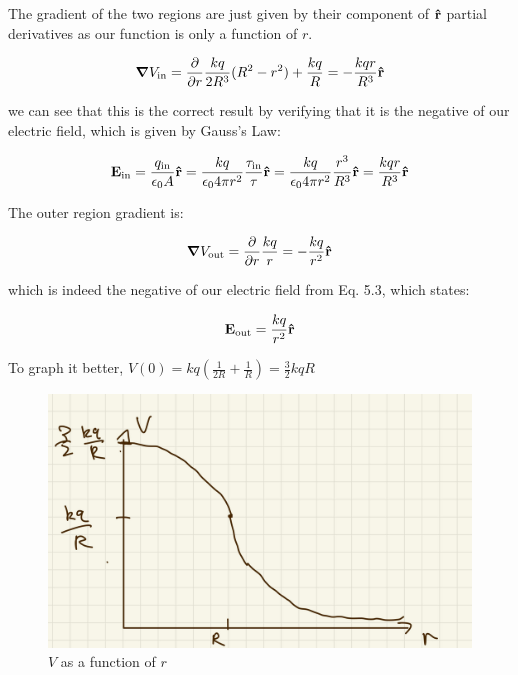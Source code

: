 \documentclass{article}
\numberwithin{equation}{section}
\numberwithin{figure}{section}
\newcommand{\vbh}[1]{\vb{\hat{#1}}}
\begin{document}
The gradient of the two regions are just given by their component of $\vbh r$ partial derivatives as our function is only a function of $r$.

\begin{equation}
    \grad V_\text{in} = \frac{\partial}{\partial r} \frac{kq}{2R^3} (R^2 - r^2) + \frac{kq}{R}= -\frac{kqr}{R^3} \vbh r
\end{equation}

we can see that this is the correct result by verifying that it is the negative of our electric field, which is given by Gauss's Law:

\begin{equation}
    \vb E_\text{in} = \frac{q_{\text{in}}}{\epsilon_0 A}\vbh r = \frac{kq}{\epsilon_0 4 \pi r^2} \frac{\tau_\text{in}}{\tau}\vbh r =  \frac{kq}{\epsilon_0 4 \pi r^2} \frac{r^3}{R^3} \vbh r= \frac{kqr}{R^3}\vbh r
\end{equation}

The outer region gradient is:

\begin{equation}
    \grad V_\text{out} = \frac{\partial}{\partial r} \frac{kq}{r} = - \frac{kq}{r^2} \vbh r
\end{equation}

which is indeed the negative of our electric field from Eq. 5.3, which states:

\begin{equation}
    \vb E_\text{out} = \frac{kq}{r^2} \vbh r
\end{equation}

To graph it better, $V(0) = kq (\frac{1}{2R} + \frac{1}{R}) = \frac{3}{2}kqR$

\begin{figure}[!htb]
    \centering
   \begin{minipage}{0.48\textwidth}
     \includegraphics[width=1.2\linewidth]{hw/hw2/5.1.jpg}
     \caption{$V$ as a function of $r$}
   \end{minipage}
\end{figure}
\end{document}
